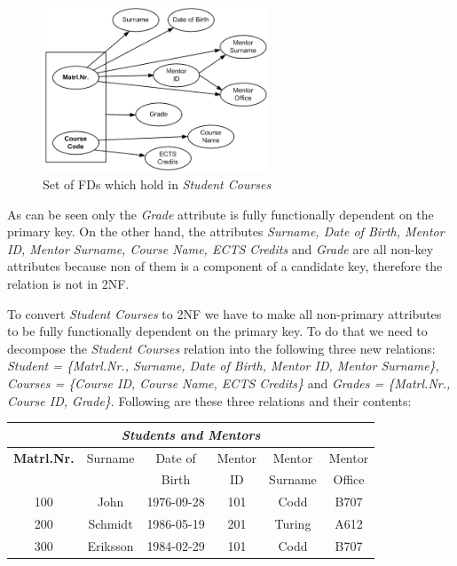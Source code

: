 \begin{figure}[h]
  \begin{center}
    \includegraphics[width=0.6\textwidth]{./img/fds01a.png}
    \caption{Set of FDs which hold in \textit{Student Courses}}
    \label{fig:fds01a}
  \end{center}
\end{figure}

As can be seen only the \textit{Grade} attribute is fully functionally dependent on the primary key.
On the other hand, the attributes \textit{Surname, Date of Birth, Mentor ID, Mentor Surname, Course Name, ECTS Credits} 
and \textit{Grade} are all non-key attributes because non of them is a component of a candidate key, therefore
the relation is not in 2NF. 

To convert \textit{Student Courses} to 2NF we have to make all non-primary attributes 
to be fully functionally dependent on the primary key. 
To do that we need to decompose the \textit{Student Courses} relation into the following three new relations:
\textit{Student = \{Matrl.Nr., Surname,  Date of Birth, Mentor ID, Mentor Surname\}}, 
\textit{Courses = \{Course ID, Course Name, ECTS Credits\}} and 
\textit{Grades = \{Matrl.Nr., Course ID,  Grade\}}.
Following are these three relations and their contents:

\begin{center}
\begin{tabular}[h]{|c|c|c|c|c|c|}
\hline
\multicolumn{6}{|c|}{\textit{Students and Mentors}} \\ \hline
\textbf{Matrl.Nr.} & Surname & Date of & Mentor & Mentor  & Mentor \\
                   &         & Birth   & ID     & Surname & Office \\
 \hline \hline
 100 & John     & 1976-09-28 & 101 & Codd   & B707 \\
 200 & Schmidt  & 1986-05-19 & 201 & Turing & A612 \\
 300 & Eriksson & 1984-02-29 & 101 & Codd   & B707 \\ \hline
\end{tabular} 
\end{center}

